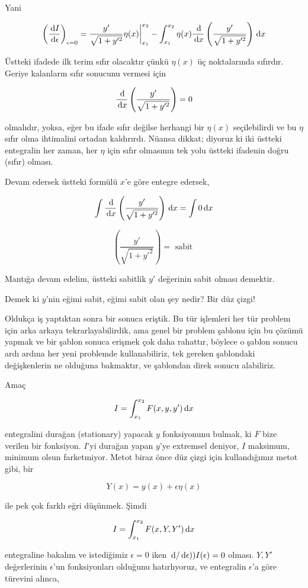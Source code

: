 \documentclass[12pt,fleqn]{article}\usepackage{../../common}
\begin{document}
Yani

$$
\left( \frac{\,\mathrm{d} I}{\,\mathrm{d} \epsilon} \right)_{\epsilon = 0} =
\frac{y'}{\sqrt{1+y'^2}} \eta(x) \bigg\vert_{x_1}^{x_2} -
\int_{x_1}^{x_2} \eta(x) \frac{\,\mathrm{d}}{\,\mathrm{d} x} \left( \frac{y'}{\sqrt{1+y'^2}} \right)
\,\mathrm{d} x
$$

Üstteki ifadede ilk terim sıfır olacaktır çünkü $\eta(x)$ üç noktalarında
sıfırdır. Geriye kalanların sıfır sonucunu vermesi için 

$$
\frac{\,\mathrm{d}}{\,\mathrm{d} x} \left( \frac{y'}{\sqrt{1+y'^2}} \right) = 0
$$

olmalıdır, yoksa, eğer bu ifade sıfır değilse herhangi bir $\eta(x)$
seçilebilirdi ve bu $\eta$ sıfır olma ihtimalini ortadan kaldırırdı. Nüansa
dikkat; diyoruz ki iki üstteki entegralin her zaman, her $\eta$ için sıfır
olmasının tek yolu üstteki ifadenin doğru (sıfır) olması.

Devam edersek üstteki formülü $x$'e göre entegre edersek, 

$$
\int \frac{\,\mathrm{d}}{\,\mathrm{d} x} \left( \frac{y'}{\sqrt{1+y'^2}} \right) \,\mathrm{d} x = \int
0 \,\mathrm{d} x 
$$

$$
 \left( \frac{y'}{\sqrt{1+y'^2}} \right) = \textrm{ sabit }
$$

Mantığa devam edelim, üstteki sabitlik $y'$ değerinin sabit olması
demektir. 

Demek ki $y$'nin eğimi sabit, eğimi sabit olan şey nedir? Bir düz çizgi! 

Oldukça iş yaptıktan sonra bir sonuca eriştik. Bu tür işlemleri her tür
problem için arka arkaya tekrarlayabilirdik, ama genel bir problem şablonu
için bu çözümü yapmak ve bir şablon sonuca erişmek çok daha rahattır,
böylece o şablon sonucu ardı ardına her yeni problemde kullanabiliriz, tek
gereken şablondaki değişkenlerin ne olduğuna bakmaktır, ve şablondan direk
sonucu alabiliriz.

Amaç 

$$
I = \int_{x_1}^{x_2} F(x,y,y') \,\mathrm{d} x
$$

entegralini durağan (stationary) yapacak $y$ fonksiyonunu bulmak, ki $F$
bize verilen bir fonksiyon. $I$'yi durağan yapan $y$'ye extremsel deniyor,
$I$ maksimum, minimum olsun farketmiyor. Metot biraz önce düz çizgi için
kullandığımız metot gibi, bir

$$
Y(x) = y(x) + \epsilon \eta(x)
$$

ile pek çok farklı eğri düşünmek. Şimdi 

$$
I = \int_{x_1}^{x_2} F(x,Y,Y') \,\mathrm{d} x
$$

entegraline bakalım ve istediğimiz $\epsilon = 0$ iken
$ \,\mathrm{d} / \,\mathrm{d} \epsilon) ) I(\epsilon) = 0$ olması. $Y,Y'$ değerlerinin
$\epsilon$'un fonksiyonları olduğunu hatırlıyoruz, ve entegralin
$\epsilon$'a göre türevini alınca, 
\end{document}

